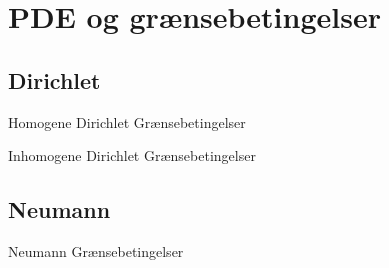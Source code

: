 
\section{PDE og grænsebetingelser}
\subsection{Dirichlet}
\begin{frame}{Homogene Dirichlet Grænsebetingelser}{}
\end{frame}

\begin{frame}{Inhomogene Dirichlet Grænsebetingelser}{}
\end{frame}
\subsection{Neumann}
\begin{frame}{Neumann Grænsebetingelser}{}
\end{frame}
